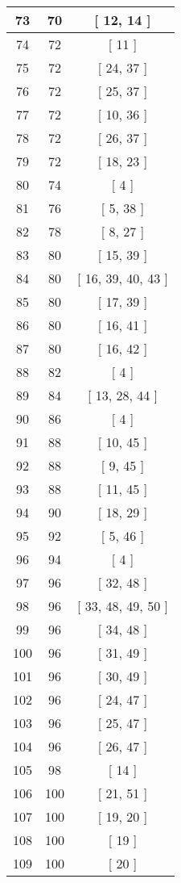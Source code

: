 \begin{center}
\begin{longtable}[H]{|| c c c ||}
73 & 70 & [ 12, 14 ] \\ 
\hline
74 & 72 & [ 11 ] \\ 
\hline
75 & 72 & [ 24, 37 ] \\ 
\hline
76 & 72 & [ 25, 37 ] \\ 
\hline
77 & 72 & [ 10, 36 ] \\ 
\hline
78 & 72 & [ 26, 37 ] \\ 
\hline
79 & 72 & [ 18, 23 ] \\ 
\hline
80 & 74 & [ 4 ] \\ 
\hline
81 & 76 & [ 5, 38 ] \\ 
\hline
82 & 78 & [ 8, 27 ] \\ 
\hline
83 & 80 & [ 15, 39 ] \\ 
\hline
84 & 80 & [ 16, 39, 40, 43 ] \\ 
\hline
85 & 80 & [ 17, 39 ] \\ 
\hline
86 & 80 & [ 16, 41 ] \\ 
\hline
87 & 80 & [ 16, 42 ] \\ 
\hline
88 & 82 & [ 4 ] \\ 
\hline
89 & 84 & [ 13, 28, 44 ] \\ 
\hline
90 & 86 & [ 4 ] \\ 
\hline
91 & 88 & [ 10, 45 ] \\ 
\hline
92 & 88 & [ 9, 45 ] \\ 
\hline
93 & 88 & [ 11, 45 ] \\ 
\hline
94 & 90 & [ 18, 29 ] \\ 
\hline
95 & 92 & [ 5, 46 ] \\ 
\hline
96 & 94 & [ 4 ] \\ 
\hline
97 & 96 & [ 32, 48 ] \\ 
\hline
98 & 96 & [ 33, 48, 49, 50 ] \\ 
\hline
99 & 96 & [ 34, 48 ] \\ 
\hline
100 & 96 & [ 31, 49 ] \\ 
\hline
101 & 96 & [ 30, 49 ] \\ 
\hline
102 & 96 & [ 24, 47 ] \\ 
\hline
103 & 96 & [ 25, 47 ] \\ 
\hline
104 & 96 & [ 26, 47 ] \\ 
\hline
105 & 98 & [ 14 ] \\ 
\hline
106 & 100 & [ 21, 51 ] \\ 
\hline
107 & 100 & [ 19, 20 ] \\ 
\hline
108 & 100 & [ 19 ] \\ 
\hline
109 & 100 & [ 20 ] \\ 

\end{longtable}
\end{center}
